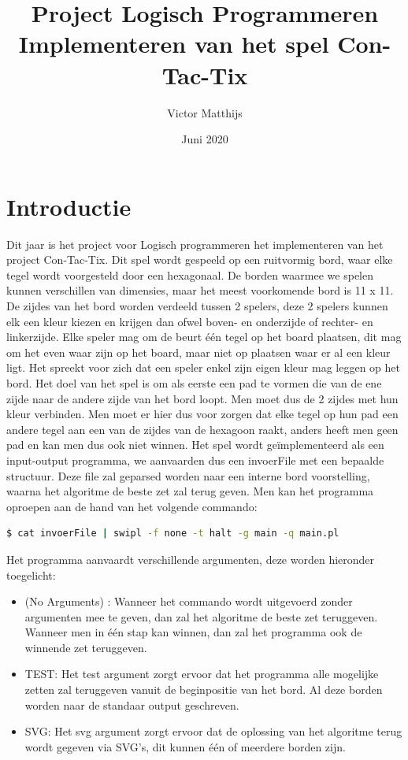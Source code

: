 \documentclass{article}
\title{%
    Project Logisch Programmeren\\
    \large Implementeren van het spel Con-Tac-Tix
    }
\author{ Victor Matthijs }
\date{Juni 2020}
\begin{document}
\maketitle
\newpage

\tableofcontents
\newpage

\section{Introductie}

Dit jaar is het project voor Logisch programmeren het implementeren van het project Con-Tac-Tix. Dit spel wordt gespeeld op een ruitvormig bord, waar elke tegel wordt voorgesteld door een hexagonaal. De borden waarmee we spelen kunnen verschillen van dimensies, maar het meest voorkomende bord is 11 x 11. De zijdes van het bord worden verdeeld tussen 2 spelers, deze 2 spelers kunnen elk een kleur kiezen en krijgen dan ofwel boven- en onderzijde of rechter- en linkerzijde. Elke speler mag om de beurt één tegel op het board plaatsen, dit mag om het even waar zijn op het board, maar niet op plaatsen waar er al een kleur ligt. Het spreekt voor zich dat een speler enkel zijn eigen kleur mag leggen op het bord. \newline
Het doel van het spel is om als eerste een pad te vormen die van de ene zijde naar de andere zijde van het bord loopt. Men moet dus de 2 zijdes met hun kleur verbinden. Men moet er hier dus voor zorgen dat elke tegel op hun pad een andere tegel aan een van de zijdes van de hexagoon raakt, anders heeft men geen pad en kan men dus ook niet winnen. \newline
\break
Het spel wordt geïmplementeerd als een input-output programma, we aanvaarden dus een invoerFile met een bepaalde structuur. Deze file zal geparsed worden naar een interne bord voorstelling, waarna het algoritme de beste zet zal terug geven. \newline
\break
Men kan het programma oproepen aan de hand van het volgende commando: 
\begin{lstlisting}[language=bash]
  $ cat invoerFile | swipl -f none -t halt -g main -q main.pl
  \end{lstlisting}
Het programma aanvaardt verschillende argumenten, deze worden hieronder toegelicht:
\begin{itemize}
  \item (No Arguments) : Wanneer het commando wordt uitgevoerd zonder argumenten mee te geven, dan zal het algoritme de beste zet teruggeven. Wanneer men in één stap kan winnen, dan zal het programma ook de winnende zet teruggeven.
  \item TEST: Het test argument zorgt ervoor dat het programma alle mogelijke zetten zal teruggeven vanuit de beginpositie van het bord. Al deze borden worden naar de standaar output geschreven.
  \item SVG: Het svg argument zorgt ervoor dat de oplossing van het algoritme terug wordt gegeven via SVG's, dit kunnen één of meerdere borden zijn.
\end{itemize}
\end{document}
